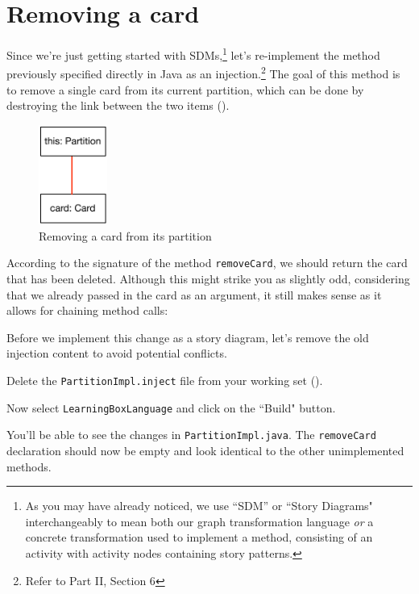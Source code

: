 \newpage
\genHeader
\chapter{Removing a card}
\hypertarget{sec:remCard}{}

Since we're just getting started with SDMs,\footnote{As you may have already noticed, we use ``SDM'' or ``Story Diagrams" interchangeably to mean both our graph
transformation language \emph{or} a concrete transformation used to implement a method, consisting of an activity with activity nodes containing story
patterns.} let's re-implement the method previously specified directly in Java as an injection.\footnote{Refer to Part II, Section 6} The goal of this method
is to remove a single card from its current partition, which can be done by destroying the link between the two items ().

\vspace{1cm}

\begin{figure}[htbp]
	\centering
    \includegraphics[width=0.2\textwidth]{../../org.moflon.doc.handbook.03_storyDiagrams/03_removeCard/splashImages/goal_removeCard.pdf}
	\caption{Removing a card from its partition}
	\label{fig:goal_removeCard}
\end{figure}
\FloatBarrier

\vspace{0.5cm}

According to the signature of the method \texttt{removeCard}, we should return the card that has been deleted. Although this might strike you as slightly odd,
considering that we already passed in the card as an argument, it still makes sense as it allows for chaining method calls:

Before we implement this change as a story diagram, let's remove the old injection content to avoid potential conflicts.

\begin{stepbystep}

\item Delete the \texttt{PartitionImpl.inject} file from your working set ().

\item Now select \texttt{LearningBoxLanguage} and click on the ``Build" button. 

\item You'll be able to see the changes in \texttt{PartitionImpl.java}. The \texttt{removeCard}
declaration should now be empty and look identical to the other unimplemented methods.

\end{stepbystep}


